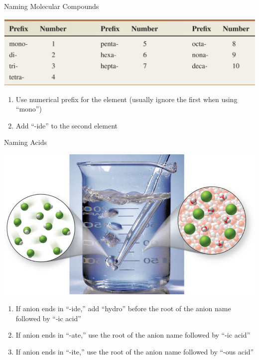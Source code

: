 \documentclass[11pt]{beamer}
\begin{document}
\begin{frame}{Naming Molecular Compounds}
  \begin{center}
    \includegraphics[width=\linewidth]{prefix_name}
  \end{center}
  
  \begin{enumerate}
  \item Use numerical prefix for the element (usually ignore the first
    when using ``mono'')
  \item Add ``-ide'' to the second element
  \end{enumerate}
\end{frame}

\begin{frame}{Naming Acids}
  \begin{center}
    \includegraphics[width=0.5\linewidth]{acid_base}
  \end{center}

  \begin{enumerate}
  \item If anion ends in ``-ide,'' add ``hydro'' before the
    root of the anion name followed by ``-ic acid''
  \item If anion ends in ``-ate,'' use the root of the anion
    name followed by ``-ic acid''
  \item If anion ends in ``-ite,'' use the root of the anion
    name followed by ``-ous acid''
  \end{enumerate}
\end{frame}
\end{document}
